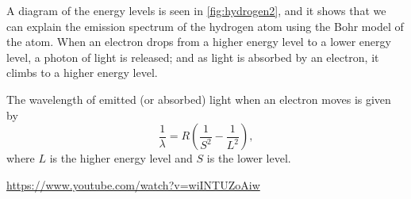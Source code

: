 \documentclass[a4paper]{amsbook}
\newcommand{\goandwatch}[1]{
\begin{center}
\begin{tcolorbox}[width=0.8\textwidth,colback={SkyBlue!20},title={\textbf{Go and watch...}},colbacktitle=MidnightBlue,coltitle=White]
  \textcolor{MidnightBlue}{\url{#1}}
\end{tcolorbox}
\end{center}}
\theoremstyle{definition}
\numberwithin{exercise}{chapter}
\numberwithin{exercise}{chapter}
\begin{document}
A diagram of the energy levels is seen in \cref{fig:hydrogen2}, and it shows that we can
explain the emission spectrum of the hydrogen atom using the Bohr model of the atom. When
an electron drops from a higher energy level to a lower energy level, a photon of light
is released; and as light is absorbed by an electron, it climbs to a higher energy level.

The wavelength of emitted (or absorbed) light when an electron moves is given by
\begin{equation}
  \frac{1}{\lambda} = R\left( \frac{1}{S^2} - \frac{1}{L^2} \right),
\end{equation}
where $ L $ is the higher energy level and $ S $ is the lower level.

\goandwatch{https://www.youtube.com/watch?v=wiINTUZoAiw}
\end{document}
